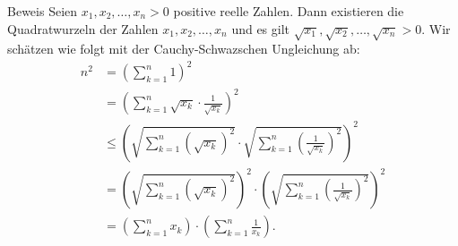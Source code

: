 \documentclass[10pt]{beamer}
\begin{document}
\begin{frame}{Beweis}
    Seien \( x_{1}, x_{2}, \ldots, x_{n} > 0 \) positive reelle Zahlen. Dann existieren die Quadratwurzeln der Zahlen \( x_{1}, x_{2}, \ldots, x_{n} \) und es gilt \( \sqrt{x_{1}}, \sqrt{x_{2}}, \ldots, \sqrt{x_{n}} > 0 \). Wir schätzen wie folgt mit der Cauchy-Schwazschen Ungleichung ab:
    \begin{align*}
        n^{2}
        & = \left( \sum_{k = 1}^{n} 1 \right)^{2} \\
        & = \left( \sum_{k = 1}^{n} \sqrt{x_{k}} \cdot \frac{1}{\sqrt{x_{k}}} \right)^{2} \\
        & \leq \left( \sqrt{\sum_{k = 1}^{n} \left( \sqrt{x_{k}} \right)^{2}} \cdot \sqrt{\sum_{k = 1}^{n} \left( \frac{1}{\sqrt{x_{k}}} \right)^{2}} \right)^{2} \\
        & = \left( \sqrt{\sum_{k = 1}^{n} \left( \sqrt{x_{k}} \right)^{2}} \right)^{2} \cdot \left( \sqrt{\sum_{k = 1}^{n} \left( \frac{1}{\sqrt{x_{k}}} \right)^{2}} \right)^{2} \\
        & = \left( \sum_{k = 1}^{n} x_{k} \right) \cdot \left( \sum_{k = 1}^{n} \frac{1}{x_{k}} \right).
    \end{align*}
\end{frame}
\end{document}
